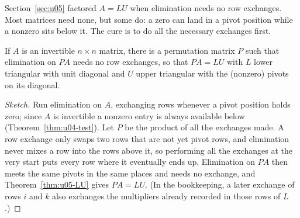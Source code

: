 Section~\ref{sec:u05} factored $A=LU$ when elimination needs no row exchanges. Most matrices
need none, but some do: a zero can land in a pivot position while a nonzero sits below it.
The cure is to do all the necessary exchanges first.

\begin{theorem}[$PA=LU$]\label{thm:u06-PALU}
If $A$ is an invertible $n\times n$ matrix, there is a permutation matrix $P$ such that
elimination on $PA$ needs no row exchanges, so that $PA=LU$ with $L$ lower triangular with
unit diagonal and $U$ upper triangular with the (nonzero) pivots on its diagonal.
\end{theorem}

\begin{proof}[Sketch]
Run elimination on $A$, exchanging rows whenever a pivot position holds zero; since $A$ is
invertible a nonzero entry is always available below (Theorem~\ref{thm:u04-test}). Let $P$
be the product of all the exchanges made. A row exchange only swaps two rows that are not yet
pivot rows, and elimination never mixes a row into the rows above it, so performing all the
exchanges at the very start puts every row where it eventually ends up. Elimination on $PA$
then meets the same pivots in the same places and needs no exchange, and
Theorem~\ref{thm:u05-LU} gives $PA=LU$. (In the bookkeeping, a later exchange of rows $i$ and
$k$ also exchanges the multipliers already recorded in those rows of $L$.)
\end{proof}

